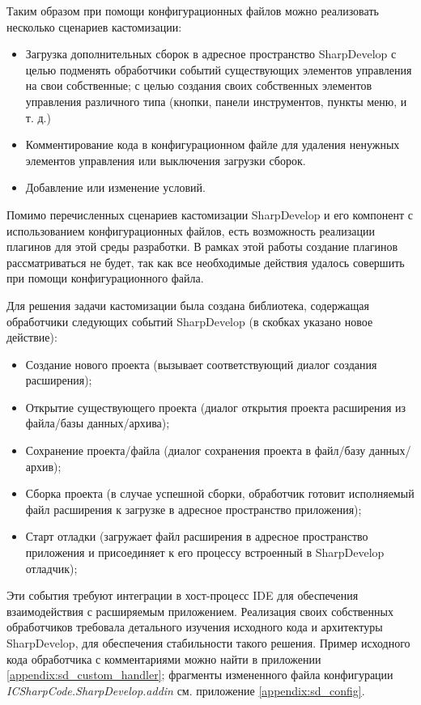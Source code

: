 Таким образом при помощи конфигурационных файлов можно реализовать несколько сценариев кастомизации:

\begin{itemize}
 \item Загрузка дополнительных сборок в адресное пространство SharpDevelop
  \subitem с целью подменять обработчики событий существующих элементов управления на свои собственные;
  \subitem с целью создания своих собственных элементов управления различного типа (кнопки, панели инструментов, пункты меню, и т. д.)
 \item Комментирование кода в конфигурационном файле для удаления ненужных элементов управления или выключения загрузки сборок.
 \item Добавление или изменение условий.
\end{itemize}
 
Помимо перечисленных сценариев кастомизации SharpDevelop и его компонент с использованием конфигурационных файлов, есть возможность реализации плагинов для этой среды разработки. В рамках этой работы создание плагинов рассматриваться не будет, так как все необходимые действия удалось совершить при помощи конфигурационного файла.
 
Для решения задачи кастомизации была создана библиотека, содержащая обработчики следующих событий SharpDevelop (в скобках указано новое действие):

\begin{itemize}
 \item Создание нового проекта (вызывает соответствующий диалог создания расширения);
 \item Открытие существующего проекта (диалог открытия проекта расширения из файла/базы данных/архива);
 \item Сохранение проекта/файла (диалог сохранения проекта в файл/базу данных/архив);
 \item Сборка проекта (в случае успешной сборки, обработчик готовит исполняемый файл расширения к загрузке в адресное пространство приложения);
 \item Старт отладки (загружает файл расширения в адресное пространство приложения и присоединяет к его процессу встроенный в SharpDevelop отладчик);
\end{itemize}

Эти события требуют интеграции в хост-процесс IDE для обеспечения взаимодействия с расширяемым приложением. Реализация своих собственных обработчиков требовала детального изучения исходного кода и архитектуры SharpDevelop, для обеспечения стабильности такого решения. Пример исходного кода обработчика с комментариями можно найти в приложении \ref{appendix:sd_custom_handler}; фрагменты измененного файла конфигурации {\it ICSharpCode.SharpDevelop.addin} см. приложение \ref{appendix:sd_config}.
 

